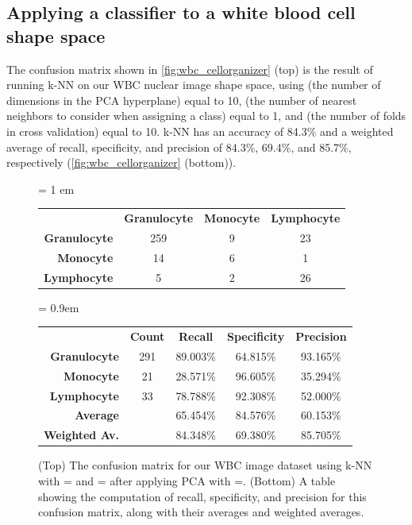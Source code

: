 \FloatBarrier
{}
\subsection{Applying a classifier to a white blood cell shape space}

The confusion matrix shown in \autoref{fig:wbc_cellorganizer} (top) is the result of running k-NN on our WBC nuclear image shape space, using  (the number of dimensions in the PCA hyperplane) equal to 10,  (the number of nearest neighbors to consider when assigning a class) equal to 1, and  (the number of folds in cross validation) equal to 10. k-NN has an accuracy of 84.3\% and a weighted average of recall, specificity, and precision of 84.3\%, 69.4\%, and 85.7\%, respectively (\autoref{fig:wbc_cellorganizer} (bottom)).\\

\begin{figure}[h]
\centering
\tabcolsep = 1 em
\mySfFamily
\begin{tabular}{r c c c}
\rowcolor{gray!50}
& \textbf{Granulocyte} & \textbf{Monocyte} & \textbf{Lymphocyte} \\
\textbf{Granulocyte} & 259 & 9 & 23 \\
\textbf{Monocyte} & \phantom{5}14 & 6 & \phantom{5}1 \\
 \textbf{Lymphocyte} & \phantom{55}5 & 2 & 26
\end{tabular}

\phantom{Test}\vspace{\baselineskip}

\tabcolsep = 0.9em
\begin{tabular}{r c c c c}
\rowcolor{gray!50}
& \textbf{Count} & \textbf{Recall} & \textbf{Specificity} & \textbf{Precision} \\
\textbf{Granulocyte} & 291 & 89.003\% & 64.815\% & 93.165\%\\
\textbf{Monocyte} & 21 & 28.571\% & 96.605\% & 35.294\% \\
\textbf{Lymphocyte} & 33 & 78.788\% & 92.308\% & 52.000\%\\
\textbf{Average} & & 65.454\% & 84.576\% & 60.153\%\\
\textbf{Weighted Av.} & & 84.348\% & 69.380\% & 85.705\%\\
\end{tabular}
\caption{(Top) The confusion matrix for our WBC image dataset using k-NN with = and = after applying PCA with =. (Bottom) A table showing the computation of recall, specificity, and precision for this confusion matrix, along with their averages and weighted averages.}
\label{fig:wbc_cellorganizer}
\end{figure}

